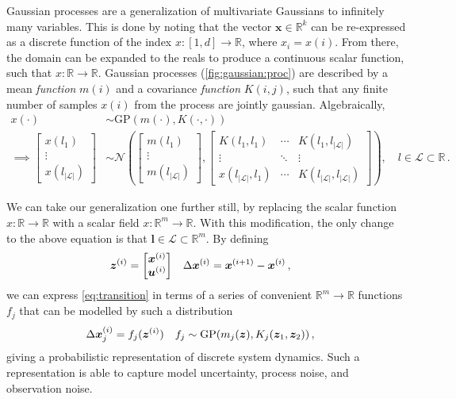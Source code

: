\documentclass[main.tex]{subfiles}
\begin{document}
	Gaussian processes are a generalization of multivariate Gaussians to infinitely many variables.
	This is done by noting that the vector $\mathbf{x} \in \mathbb{R}^k$ can be re-expressed as a discrete function of the index $x\colon [1,d] \to \mathbb{R}$, where $x_i = x(i)$.
	From there, the domain can be expanded to the reals to produce a continuous scalar function, such that $x\colon \mathbb{R} \to \mathbb{R}$.
	Gaussian processes (\cref{fig:gaussian:proc}) are described by a mean \emph{function} $m(i)$ and a covariance \emph{function} $K(i, j)$, such that any finite number of samples $x(i)$ from the process are jointly gaussian. Algebraically,
	\begin{align}
		x(\cdot) &\sim \mathrm{GP}(m(\cdot), K(\cdot,\cdot)) \\
		\implies
		\begin{bmatrix}
			x(l_1) \\
			\vdots \\
			x(l_{|\mathcal{L}|})
		\end{bmatrix} &\sim \mathcal{N}\left(\begin{bmatrix}
			m(l_1) \\
			\vdots \\
			m(l_{|\mathcal{L}|})
		\end{bmatrix}, \begin{bmatrix}
			K(l_1,l_1) & \cdots & K(l_1,l_{|\mathcal{L}|}) \\
			\vdots & \ddots & \vdots \\
			x(l_{|\mathcal{L}|},l_1) & \cdots & K(l_{|\mathcal{L}|},l_{|\mathcal{L}|})
		\end{bmatrix}\right), \quad l \in \mathcal{L} \subset \mathbb{R}\,.
	\end{align}

	We can take our generalization one further still, by replacing the scalar function $x\colon \mathbb{R} \to \mathbb{R}$ with a scalar field $x\colon \mathbb{R}^m \to \mathbb{R}$.
	With this modification, the only change to the above equation is that $\bm{l} \in \mathcal{L} \subset \mathbb{R}^m$.
	By defining
	\begin{align}
		\bm{z}^{(i)} &= \begin{bmatrix}\bm{x}^{(i)} \\ \bm{u}^{(i)}\end{bmatrix} &
		\Delta\bm{x}^{(i)} &= \bm{x}^{(i + 1)} - \bm{x}^{(i)}\,,
	\end{align}
	we can express \cref{eq:transition} in terms of a series of convenient $\mathbb{R}^m \to \mathbb{R}$ functions $f_j$ that can be modelled by such a distribution
	\begin{align}
		\Delta\bm{x}^{(i)}_j &= f_j(\bm{z}^{(i)}) & f_j &\sim \mathrm{GP}(m_j(\bm{z}), K_j(\bm{z}_1, \bm{z}_2))\,, \label{eq:transition-gp}
	\end{align}
	giving a probabilistic representation of discrete system dynamics.
	Such a representation is able to capture model uncertainty, process noise, and observation noise.
\end{document}
